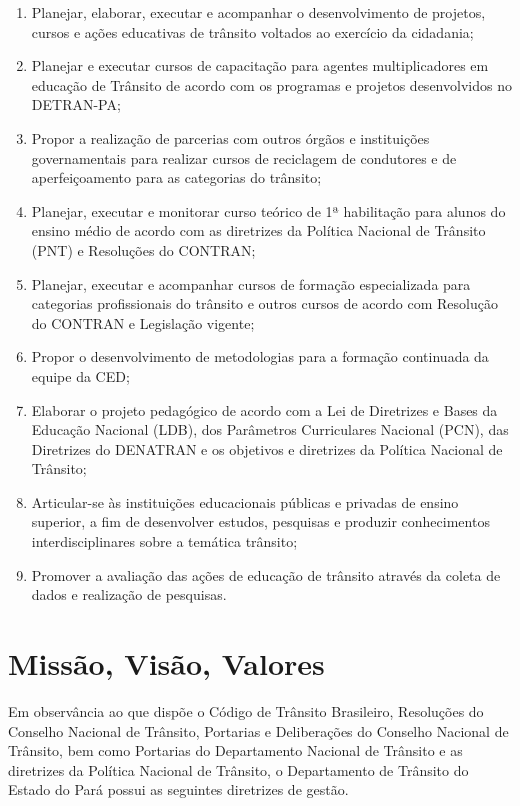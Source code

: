 \documentclass[a4paper]{article}
\begin{document}
\begin{enumerate}
\item Planejar, elaborar, executar e acompanhar o desenvolvimento de projetos, cursos e ações educativas de trânsito voltados ao exercício da cidadania;
\item Planejar e executar cursos de capacitação para agentes multiplicadores em educação de Trânsito de acordo com os programas e projetos desenvolvidos no DETRAN-PA;
\item Propor a realização de parcerias com outros órgãos e instituições governamentais para realizar cursos de reciclagem de condutores e de aperfeiçoamento para as categorias do trânsito;
\item Planejar, executar e monitorar curso teórico de 1ª habilitação para alunos do ensino médio de acordo com as diretrizes da Política Nacional de Trânsito (PNT) e Resoluções do CONTRAN;
\item Planejar, executar e acompanhar cursos de formação especializada para categorias profissionais do trânsito e outros cursos de acordo com Resolução do CONTRAN e Legislação vigente;
\item Propor o desenvolvimento de metodologias para a formação continuada da equipe da CED;
\item Elaborar o projeto pedagógico de acordo com a Lei de Diretrizes e Bases da Educação Nacional (LDB), dos Parâmetros Curriculares Nacional (PCN), das Diretrizes do DENATRAN e os objetivos e diretrizes da Política Nacional de Trânsito;
\item Articular-se às instituições educacionais públicas e privadas de ensino superior, a fim de desenvolver estudos, pesquisas e produzir conhecimentos interdisciplinares sobre a temática trânsito;
\item Promover a avaliação das ações de educação de trânsito através da coleta de dados e realização de pesquisas.
\end{enumerate}



\section{Missão, Visão, Valores}

Em observância ao que dispõe o Código de Trânsito Brasileiro, Resoluções do Conselho Nacional de Trânsito, Portarias e Deliberações do Conselho Nacional de Trânsito, bem como Portarias do Departamento Nacional de Trânsito e as diretrizes da Política Nacional de Trânsito, o Departamento de Trânsito do Estado do Pará possui as seguintes diretrizes de gestão.
\end{document}
